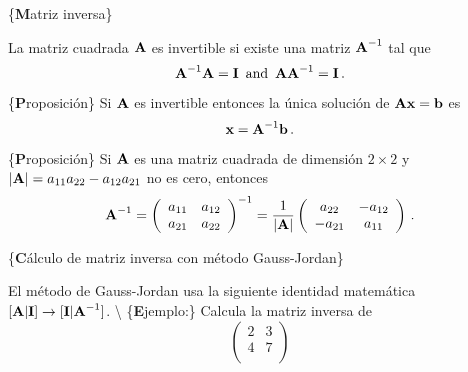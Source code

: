 \documentclass[
]{agujournal2019}
\begin{document}
\{\noindent \textbf Matriz inversa\}

\noindent La matriz cuadrada \({\textbf A}\) es invertible si existe una
matriz \({\textbf A}^{-1}\) tal que
\[{\textbf A}^{-1}{\textbf A}={\textbf I}\,\,\,{\rm and}\,\,\,{\textbf A}{\textbf A}^{-1}={\textbf I}\,.\]

\vspace{0.5cm}

\{\noindent \textbf Proposición\} Si \({\textbf A}\) es invertible
entonces la única solución de \({\textbf A}{\textbf x}={\textbf b}\) es
\[{\textbf x}={\textbf A}^{-1}{\textbf b}\,.\]

\vspace{0.5cm}

\{\noindent \textbf Proposición\} Si \({\textbf A}\) es una matriz
cuadrada de dimensión \(2\times 2\) y
\(|{\textbf A}|=a_{11}a_{22} - a_{12}a_{21}\) no es cero, entonces
\[{\textbf A}^{-1}=\left(\begin{array}{cc}
  a_{11} & a_{12} \\
  a_{21} & a_{22} \\
\end{array}
  \right)^{-1} =
  \frac{1}{|{\textbf A}|}
  \left(\begin{array}{cc}
  a_{22} & -a_{12} \\
  -a_{21} & a_{11} \\
\end{array}
  \right)
\,.\]

\vspace{0.5cm}

\{\noindent \textbf Cálculo de matriz inversa con método Gauss-Jordan\}

\noindent El método de Gauss-Jordan usa la siguiente identidad
matemática
\([{\textbf A}|{\textbf I}]\rightarrow [{\textbf I}|{\textbf A}^{-1}]\).
\textbackslash{} \{\textbf Ejemplo:\} Calcula la matriz inversa de
\[\left(\begin{array}{cc}
  2 & 3 \\
  4 & 7 \\
\end{array}
  \right)\]
\end{document}
